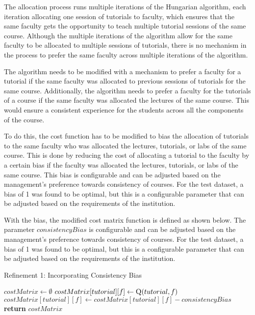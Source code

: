 The allocation process runs multiple iterations of the Hungarian algorithm, each iteration allocating one session of tutorials to faculty, which ensures that the same faculty gets the opportunity to teach multiple tutorial sessions of the same course. Although the multiple iterations of the algorithm allow for the same faculty to be allocated to multiple sessions of tutorials, there is no mechanism in the process to prefer the same faculty across multiple iterations of the algorithm.

The algorithm needs to be modified with a mechanism to prefer a faculty for a tutorial if the same faculty was allocated to previous sessions of tutorials for the same course. Additionally, the algorithm needs to prefer a faculty for the tutorials of a course if the same faculty was allocated the lectures of the same course. This would ensure a consistent experience for the students across all the components of the course.

To do this, the cost function has to be modified to bias the allocation of tutorials to the same faculty who was allocated the lectures, tutorials, or labs of the same course. This is done by reducing the cost of allocating a tutorial to the faculty by a certain bias if the faculty was allocated the lectures, tutorials, or labs of the same course. This bias is configurable and can be adjusted based on the management's preference towards consistency of courses. For the test dataset, a bias of 1 was found to be optimal, but this is a configurable parameter that can be adjusted based on the requirements of the institution.

With the bias, the modified cost matrix function is defined as shown below. The parameter $consistencyBias$ is configurable and can be adjusted based on the management's preference towards consistency of courses. For the test dataset, a bias of 1 was found to be optimal, but this is a configurable parameter that can be adjusted based on the requirements of the institution.

\begin{algorithm}[H]
  \caption*{Refinement 1: Incorporating Consistency Bias}
  \begin{algorithmic}
    \State $costMatrix \gets \emptyset$
    \State $costMatrix[tutorial][f] \gets \Call{Q}{tutorial, f}$
    \State $costMatrix[tutorial][f] \gets costMatrix[tutorial][f] - consistencyBias$
    \EndIf
    \EndFor
    \EndFor
    \State \textbf{return} $costMatrix$
    \EndProcedure
  \end{algorithmic}
\end{algorithm}

